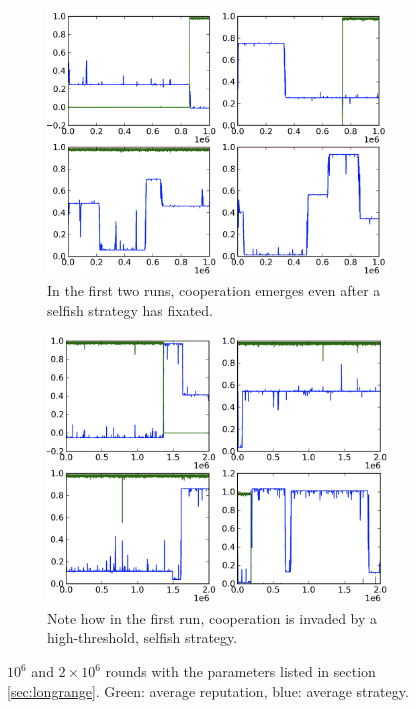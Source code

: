\documentclass{amsart}
\begin{document}
\begin{figure}[h!tbp]
  \begin{subfigure}{.485\linewidth}
    \includegraphics[width=\linewidth]{really.png}
    \caption{In the first two runs, cooperation emerges even after a
      selfish strategy has fixated.}
    \label{fig:really}
  \end{subfigure}
  \hspace{.01\linewidth}
  \begin{subfigure}{.485\linewidth}
    \includegraphics[width=\linewidth]{what.png}
    \caption{Note how in the first run, cooperation is invaded by a
      high-threshold, selfish strategy.}
    \label{fig:what}
  \end{subfigure}
    \caption{$10^6$ and $2 \times 10^6$ rounds with the parameters
      listed in section \ref{sec:longrange}. Green: average
      reputation, blue: average strategy.}
\end{figure}
\end{document}
